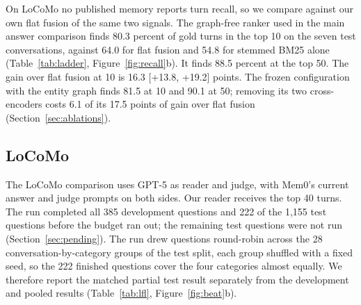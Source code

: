 On LoCoMo no published memory reports turn recall, so we compare against our own flat fusion of the same two signals. The graph-free ranker used in the main answer comparison finds 80.3 percent of gold turns in the top 10 on the seven test conversations, against 64.0 for flat fusion and 54.8 for stemmed BM25 alone (Table~\ref{tab:ladder}, Figure~\ref{fig:recall}b). It finds 88.5 percent at the top 50. The gain over flat fusion at 10 is 16.3 [+13.8, +19.2] points. The frozen configuration with the entity graph finds 81.5 at 10 and 90.1 at 50; removing its two cross-encoders costs 6.1 of its 17.5 points of gain over flat fusion (Section~\ref{sec:ablations}).

\subsection{LoCoMo}
\label{sec:locomo}

The LoCoMo comparison uses GPT-5 as reader and judge, with Mem0's current answer and judge prompts on both sides. Our reader receives the top 40 turns. The run completed all 385 development questions and 222 of the 1,155 test questions before the budget ran out; the remaining test questions were not run (Section~\ref{sec:pending}). The run drew questions round-robin across the 28 conversation-by-category groups of the test split, each group shuffled with a fixed seed, so the 222 finished questions cover the four categories almost equally. We therefore report the matched partial test result separately from the development and pooled results (Table~\ref{tab:lfl}, Figure~\ref{fig:beat}b).

